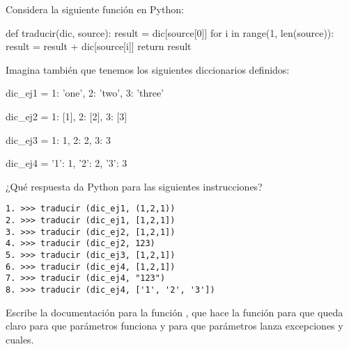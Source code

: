 \begin{exercise}
Considera la siguiente función en Python:

\begin{python}
def traducir(dic, source):
    result = dic[source[0]]
    for i in range(1, len(source)):
        result = result + dic[source[i]]
    return result
\end{python}

Imagina también que tenemos los siguientes diccionarios definidos:

\begin{small}
\begin{python}
dic_ej1 = {
    1: 'one',
    2: 'two',
    3: 'three'
    }

dic_ej2 = {
    1: [1],
    2: [2],
    3: [3]
    }

dic_ej3 = {
    1: 1,
    2: 2,
    3: 3
    }

dic_ej4 = {
    '1': 1,
    '2': 2,
    '3': 3
    }
\end{python}
\end{small}

¿Qué respuesta da Python para las siguientes instrucciones?

\begin{small}
\begin{Verbatim}[frame=single]
1. >>> traducir (dic_ej1, (1,2,1))
2. >>> traducir (dic_ej1, [1,2,1])
3. >>> traducir (dic_ej2, [1,2,1])
4. >>> traducir (dic_ej2, 123)
5. >>> traducir (dic_ej3, [1,2,1])
6. >>> traducir (dic_ej4, [1,2,1])
7. >>> traducir (dic_ej4, "123")
8. >>> traducir (dic_ej4, ['1', '2', '3'])
\end{Verbatim}
\end{small}
\end{exercise}



\begin{exercise}
Escribe la documentación para la función , que hace la función para que queda claro para que parámetros funciona y para que parámetros lanza excepciones y cuales.
\end{exercise} 


